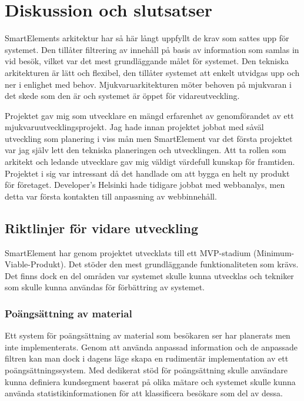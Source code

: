 \section{Diskussion och slutsatser}

SmartElements arkitektur har så här långt uppfyllt de krav som sattes upp för systemet. Den tillåter filtrering av innehåll på basis av information som samlas in vid besök, vilket var det mest grundläggande målet för systemet. Den tekniska arkitekturen är lätt och flexibel, den tillåter systemet att enkelt utvidgas upp och ner i enlighet med behov. Mjukvaruarkitekturen möter behoven på mjukvaran i det skede som den är och systemet är öppet för vidareutveckling.

Projektet gav mig som utvecklare en mängd erfarenhet av genomförandet av ett mjukvaruutvecklingsprojekt. Jag hade innan projektet jobbat med såväl utveckling som planering i viss mån men SmartElement var det första projektet var jag själv lett den tekniska planeringen och utvecklingen. Att ta rollen som arkitekt och ledande utvecklare gav mig väldigt värdefull kunskap för framtiden. Projektet i sig var intressant då det handlade om att bygga en helt ny produkt för företaget. Developer's Helsinki hade tidigare jobbat med webbanalys, men detta var första kontakten till anpassning av webbinnehåll.

\subsection{Riktlinjer för vidare utveckling}

SmartElement har genom projektet utvecklats till ett MVP-stadium (Minimum-Viable-Produkt). Det stöder den mest grundläggande funktionaliteten som krävs. Det finns dock en del områden var systemet skulle kunna utvecklas och tekniker som skulle kunna användas för förbättring av systemet.

\subsubsection{Poängsättning av material}

Ett system för poängsättning av material som besökaren ser har planerats men inte implementerats. Genom att använda anpassad information och de anpassade filtren kan man dock i dagens läge skapa en rudimentär implementation av ett poängsättningssystem. Med dedikerat stöd för poängsättning skulle användare kunna definiera kundsegment baserat på olika mätare och systemet skulle kunna använda statistikinformationen för att klassificera besökare som del av dessa.

